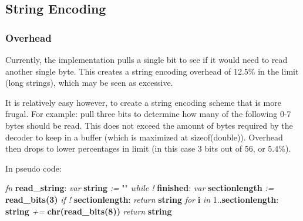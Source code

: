 \subsection{String Encoding}

\subsubsection{Overhead}

Currently, the implementation pulls a single bit to see if it would need
to read another single byte. This creates a string encoding overhead of
12.5\% in the limit (long strings), which may be seen as excessive.

It is relatively easy however, to create a string encoding scheme that
is more frugal. For example: pull three bits to determine how many of the
following 0-7 bytes should be read. This does not exceed the amount of
bytes required by the decoder to keep in a buffer (which is maximized at
sizeof(double)). Overhead then drops to lower percentages in limit
(in this case 3 bits out of 56, or 5.4\%).

In pseudo code:

\begin{changemargin}{-60mm}{0mm}
\begin{myquote}

\vbox{
\textit{fn} \textbf{read\_string}: \newline
\indent\hspace{.5cm} \textit{var} \textbf{string} \textit{:=} "" \newline
\indent\hspace{.5cm} \textit{while !} \textbf{finished}: \newline
\indent\hspace{1cm} \textit{var} \textbf{sectionlength} \textit{:=} \textbf{read\_bits(3)} \newline
\indent\hspace{1cm} \textit{if !} \textbf{sectionlength}: \newline
\indent\hspace{1.5cm} \textit{return} \textbf{string} \newline
\indent\hspace{1cm} \textit{for} \textbf{i} \textit{in} 1..\textbf{sectionlength}: \newline
\indent\hspace{1.5cm} \textbf{string} \textit{+=} \textbf{chr(read\_bits(8))} \newline
\indent\hspace{.5cm} \textit{return} \textbf{string} \newline
}

\end{myquote}
\end{changemargin}

